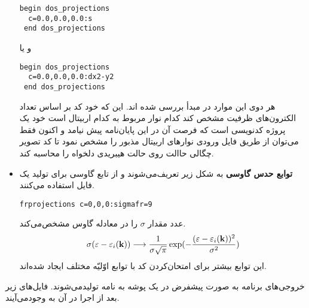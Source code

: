 \begin{itemize}
\begin{latin}
\begin{lstlisting}[style=Mybash]
  begin dos_projections
  c=0.0,0.0,0.0:s
 end dos_projections
\end{lstlisting}
\end{latin}
و یا 
\begin{latin}
\begin{lstlisting}[style=Mybash]
  begin dos_projections
  c=0.0,0.0,0.0:dx2-y2
 end dos_projections
\end{lstlisting}
\end{latin}
هر دوی این موارد در مبدأ بررسی شده ‌اند. این که خود کد بر اساس تعداد الکترون‌های ظرفیت مشخص کند کدام نوار مربوط به کدام اربیتال است خود یک پروژه کدنویسی است که 
فرصت آن در این پایان‌نامه پیش نیامد و اکنون فقط می‌توان از طریق فایل ورودی  نوارهای اربیتال مذبور را مشخص نمود تا کد تصویر چگالی حاالت روی حالت 
هیبریدی دلخواه را محاسبه کند.
\item{\bf توابع حدس گاوسی}
به شکل زیر تعریف‌می‌شوند و از تابع گاوسی برای تولید یک فایل  استفاده می‌کنند. 
\begin{latin}
\begin{lstlisting}[style=Mybash]
frprojections c=0,0,0:sigmafr=9
\end{lstlisting}
\end{latin}
 عدد  مقدار $\sigma$ را در معادله گاوس مشخص‌می‌کند. \cite{Weisstein}
 \begin{equation}
  \sigma(\varepsilon-\varepsilon_i({\bf k}))\longrightarrow\frac{1}{\sigma\sqrt{\pi}}\exp(-\frac{(\varepsilon-\varepsilon_i({\bf k}))^2}{\sigma^2})
 \end{equation}
 این توابع بیشتر برای امتحان‌کردن کد با توابع اوّلیّه مختلف ایجاد شده‌اند.
\end{itemize}
خروجی‌های برنامه  به صورت پیشفرض در یک پوشه به نامه  تولید‌می‌شوند. فایل‌های زیر بعد از اجرا در آن به وجود‌می‌آیند.
